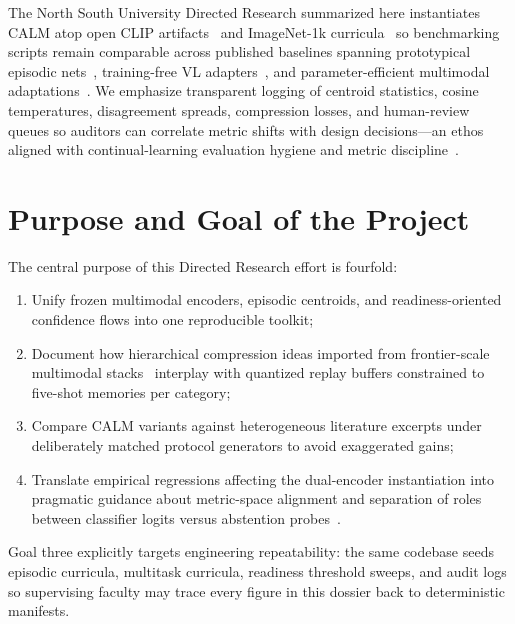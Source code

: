 \documentclass[12pt,a4paper]{report}
\begin{document}
The North South University Directed Research summarized here instantiates CALM atop open CLIP artifacts~\cite{r1} and ImageNet-1k curricula~\cite{r2} so benchmarking scripts remain comparable across published baselines spanning prototypical episodic nets~\cite{r3}, training-free VL adapters~\cite{r4}, and parameter-efficient multimodal adaptations~\cite{r14,r15}. We emphasize transparent logging of centroid statistics, cosine temperatures, disagreement spreads, compression losses, and human-review queues so auditors can correlate metric shifts with design decisions---an ethos aligned with continual-learning evaluation hygiene and metric discipline~\cite{r19}.

\section{Purpose and Goal of the Project}
The central purpose of this Directed Research effort is fourfold:
\begin{enumerate}\setlength\itemsep{0.35em}
  \item Unify frozen multimodal encoders, episodic centroids, and readiness-oriented confidence flows into one reproducible toolkit;
  \item Document how hierarchical compression ideas imported from frontier-scale multimodal stacks~\cite{r31,r32} interplay with quantized replay buffers constrained to five-shot memories per category;
  \item Compare CALM variants against heterogeneous literature excerpts under deliberately matched protocol generators to avoid exaggerated gains;
  \item Translate empirical regressions affecting the dual-encoder instantiation into pragmatic guidance about metric-space alignment and separation of roles between classifier logits versus abstention probes~\cite{r5,r10}.
\end{enumerate}
Goal three explicitly targets engineering repeatability: the same codebase seeds episodic curricula, multitask curricula, readiness threshold sweeps, and audit logs so supervising faculty may trace every figure in this dossier back to deterministic manifests.
\end{document}

